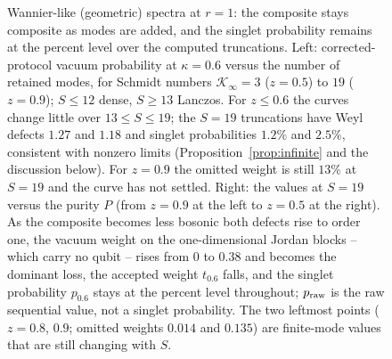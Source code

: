 \documentclass[11pt,a4paper]{article}
\begin{document}
\begin{figure}[t]
\caption{Wannier-like (geometric) spectra at $r=1$: the composite stays composite as modes are added, and the singlet probability remains at the percent level over the computed truncations. Left: corrected-protocol vacuum probability at $\kappa=0.6$ versus the number of retained modes, for Schmidt numbers $\mathcal K_\infty=3$ ($z=0.5$) to $19$ ($z=0.9$); $S\le12$ dense, $S\ge13$ Lanczos. For $z\le0.6$ the curves change little over $13\le S\le19$; the $S=19$ truncations have Weyl defects $1.27$ and $1.18$ and singlet probabilities $1.2\%$ and $2.5\%$, consistent with nonzero limits (Proposition~\ref{prop:infinite} and the discussion below). For $z=0.9$ the omitted weight is still $13\%$ at $S=19$ and the curve has not settled. Right: the values at $S=19$ versus the purity $P$ (from $z=0.9$ at the left to $z=0.5$ at the right). As the composite becomes less bosonic both defects rise to order one, the vacuum weight on the one-dimensional Jordan blocks -- which carry no qubit -- rises from $0$ to $0.38$ and becomes the dominant loss, the accepted weight $t_{0.6}$ falls, and the singlet probability $p_{0.6}$ stays at the percent level throughout; $p_{\rm raw}$ is the raw sequential value, not a singlet probability. The two leftmost points ($z=0.8$, $0.9$; omitted weights $0.014$ and $0.135$) are finite-mode values that are still changing with $S$.}
\label{fig:purity}
\end{figure}
\end{document}
